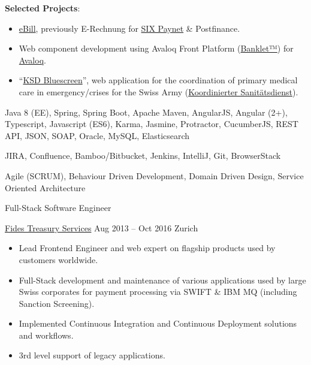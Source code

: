 \documentclass[11pt, a4paper, ragged2e, withhyper]{altacv}
\renewcommand{\cvevent}[4]{%
  {\Large\color{emphasis}#1\par}
  \medskip\normalsize
  \ifstrequal{#2}{}{}{
  	{#2}}
  \ifstrequal{#3}{}{}{{
  	\hspace{0.5em}
  	{#3}}}
  \ifstrequal{#4}{}{}{{
  	\hspace{0.5em}
  	{#4}}}\par
  \medskip\normalsize
}
\begin{document}
\begin{paracol}{2}
	\bigskip
	\textbf{\small{Selected Projects}}:
	\smallskip
	\begin{itemize}[label=\color{bullet}\textbullet]
		\small
		\item \href{https://www.ebill.ch/}{eBill}, previously E-Rechnung for \href{https://www.six-group.com/en/site/banking-services/paynet.html}{SIX Paynet} \& Postfinance.
		\item Web component development using Avaloq Front Platform (\href{https://developer.avaloq.com/web/developer-portal/learn}{Banklet™}) for \href{https://www.avaloq.com/en/}{Avaloq}.
		\item \enquote{\href{https://blog.alertswiss.ch/de/rubriken/bevoelkerungsschutz/koordinierter-sanitaetsdienst-ksd-neues-management-tool-blue-screen-switzerland/}{KSD Bluescreen}}, web application for the coordination of primary medical care in emergency/crises for the Swiss Army (\href{https://www.vtg.admin.ch/de/organisation/astab/san/ksd.html}{Koordinierter Sanitätsdienst}).
	\end{itemize}

	\bigskip
	\begin{description}
		\small
		\item [Technologies:] Java 8 (EE), Spring, Spring Boot, Apache Maven, AngularJS, Angular (2+), Typescript, Javascript (ES6), Karma, Jasmine, Protractor, CucumberJS, REST API, JSON, SOAP, Oracle, MySQL, Elasticsearch\smallskip
		\item [Tools:] JIRA, Confluence, Bamboo/Bitbucket, Jenkins, IntelliJ, Git, BrowserStack\smallskip
		\item [Methodologies:] Agile (SCRUM), Behaviour Driven Development, Domain Driven Design, Service Oriented Architecture
	\end{description}

	\bigskip\bigskip

	\cvevent{Full-Stack Software Engineer}{\href{https://www.fides.ch}{Fides Treasury Services}}{Aug 2013 -- Oct 2016}{Zurich}

	\bigskip
	\begin{itemize}[label=\color{bullet}\textbullet]
		\item Lead Frontend Engineer and web expert on flagship products used by customers worldwide.
		\item Full-Stack development and maintenance of various applications used by large Swiss corporates for payment processing via SWIFT \& IBM MQ (including Sanction Screening).
		\item Implemented Continuous Integration and Continuous Deployment solutions and workflows. 
		\item 3rd level support of legacy applications.
	\end{itemize}


\end{paracol}
\end{document}
